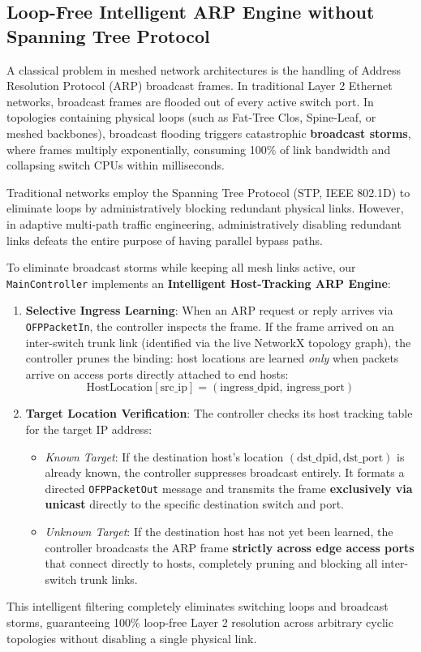\subsection{Loop-Free Intelligent ARP Engine without Spanning Tree Protocol}
A classical problem in meshed network architectures is the handling of Address Resolution Protocol (ARP) broadcast frames. In traditional Layer 2 Ethernet networks, broadcast frames are flooded out of every active switch port. In topologies containing physical loops (such as Fat-Tree Clos, Spine-Leaf, or meshed backbones), broadcast flooding triggers catastrophic \textbf{broadcast storms}, where frames multiply exponentially, consuming 100\% of link bandwidth and collapsing switch CPUs within milliseconds.

Traditional networks employ the Spanning Tree Protocol (STP, IEEE 802.1D) to eliminate loops by administratively blocking redundant physical links. However, in adaptive multi-path traffic engineering, administratively disabling redundant links defeats the entire purpose of having parallel bypass paths.

To eliminate broadcast storms while keeping all mesh links active, our \texttt{MainController} implements an \textbf{Intelligent Host-Tracking ARP Engine}:
\begin{enumerate}
    \item \textbf{Selective Ingress Learning}: When an ARP request or reply arrives via \texttt{OFPPacketIn}, the controller inspects the frame. If the frame arrived on an inter-switch trunk link (identified via the live NetworkX topology graph), the controller prunes the binding: host locations are learned \emph{only} when packets arrive on access ports directly attached to end hosts:
    \begin{equation}
        \text{HostLocation}[\text{src\_ip}] = (\text{ingress\_dpid}, \, \text{ingress\_port})
    \end{equation}
    \item \textbf{Target Location Verification}: The controller checks its host tracking table for the target IP address:
    \begin{itemize}
        \item \emph{Known Target}: If the destination host's location $(\text{dst\_dpid}, \text{dst\_port})$ is already known, the controller suppresses broadcast entirely. It formats a directed \texttt{OFPPacketOut} message and transmits the frame \textbf{exclusively via unicast} directly to the specific destination switch and port.
        \item \emph{Unknown Target}: If the destination host has not yet been learned, the controller broadcasts the ARP frame \textbf{strictly across edge access ports} that connect directly to hosts, completely pruning and blocking all inter-switch trunk links.
    \end{itemize}
\end{enumerate}
This intelligent filtering completely eliminates switching loops and broadcast storms, guaranteeing 100\% loop-free Layer 2 resolution across arbitrary cyclic topologies without disabling a single physical link.

